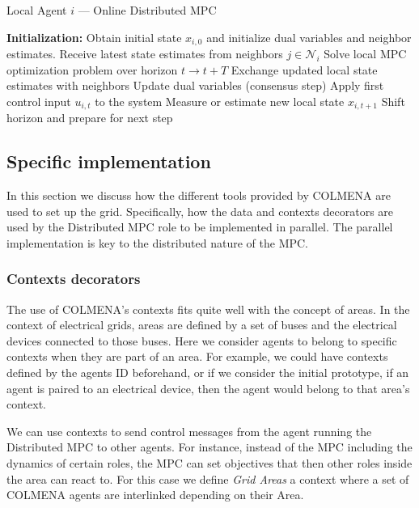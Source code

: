 \documentclass{article}
\begin{document}
\begin{algorithm}[H]
\caption{Local Agent $i$ — Online Distributed MPC}
\begin{algorithmic}[1]
\State \textbf{Initialization:} Obtain initial state $x_{i,0}$ and initialize dual variables and neighbor estimates.
        \State Receive latest state estimates from neighbors $j \in \mathcal{N}_i$
        \State Solve local MPC optimization problem over horizon $t \rightarrow t+T$
        \State Exchange updated local state estimates with neighbors
        \State Update dual variables (consensus step)
    \EndWhile
    \State Apply first control input $u_{i,t}$ to the system
    \State Measure or estimate new local state $x_{i,t+1}$
    \State Shift horizon and prepare for next step
\EndWhile
\end{algorithmic}
\end{algorithm}

\subsection{Specific implementation}

In this section we discuss how the different tools provided by COLMENA are used to set up the grid. Specifically, how the data and contexts decorators are used by the Distributed MPC role to be implemented in parallel. The parallel implementation is key to the distributed nature of the MPC.

\subsubsection*{Contexts decorators}

The use of COLMENA's contexts fits quite well with the concept of areas. In the context of electrical grids, areas are defined  by a set of buses and the electrical devices connected to those buses. Here we consider agents to belong to specific contexts when they are part of an area. For example, we could have contexts defined by the agents ID beforehand, or if we consider the initial prototype, if an agent is paired to an electrical device, then the agent would belong to that area's context.

We can use contexts to send control messages from the agent running the Distributed MPC to other agents. For instance, instead of the MPC including the dynamics of certain roles, the MPC can set objectives that then other roles inside the area can react to. For this case we define \textit{Grid Areas} a context where a set of COLMENA agents are interlinked depending on their Area.
\end{document}
